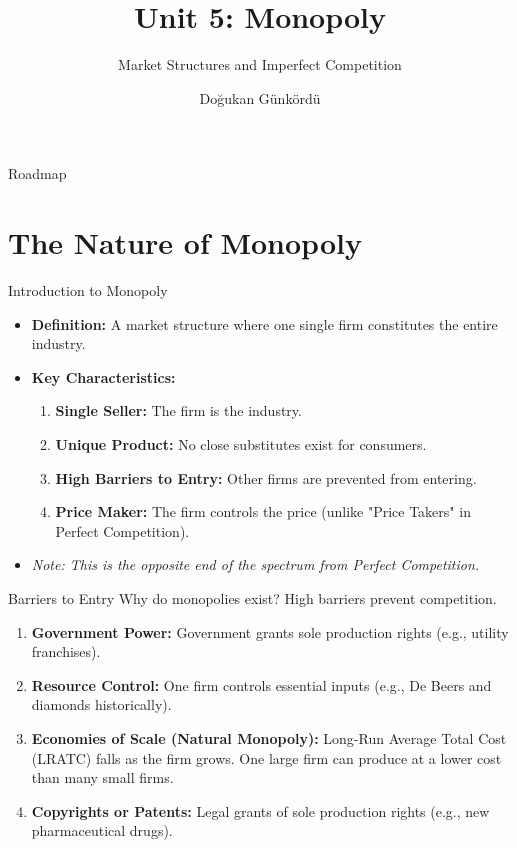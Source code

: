 \documentclass[aspectratio=169, 10pt]{beamer}
\title{Unit 5: Monopoly}
\subtitle{Market Structures and Imperfect Competition}
\author{Doğukan Günkördü}
\date{}
\begin{document}
\begin{frame}
    \titlepage
\end{frame}

\begin{frame}{Roadmap}
    \tableofcontents
\end{frame}

\section{The Nature of Monopoly}

\begin{frame}{Introduction to Monopoly}
    \begin{itemize}
        \item \textbf{Definition:} A market structure where one single firm constitutes the entire industry.
        \item \textbf{Key Characteristics:}
            \begin{enumerate}
                \item \textbf{Single Seller:} The firm is the industry.
                \item \textbf{Unique Product:} No close substitutes exist for consumers.
                \item \textbf{High Barriers to Entry:} Other firms are prevented from entering.
                \item \textbf{Price Maker:} The firm controls the price (unlike "Price Takers" in Perfect Competition).
            \end{enumerate}
        \item \textit{Note: This is the opposite end of the spectrum from Perfect Competition.}
    \end{itemize}
\end{frame}

\begin{frame}{Barriers to Entry}
    Why do monopolies exist? High barriers prevent competition.
    \vspace{0.5cm}
    \begin{enumerate}
        \item \textbf{Government Power:} Government grants sole production rights (e.g., utility franchises).
        \item \textbf{Resource Control:} One firm controls essential inputs (e.g., De Beers and diamonds historically).
        \item \textbf{Economies of Scale (Natural Monopoly):} Long-Run Average Total Cost (LRATC) falls as the firm grows. One large firm can produce at a lower cost than many small firms.
        \item \textbf{Copyrights or Patents:} Legal grants of sole production rights (e.g., new pharmaceutical drugs).
    \end{enumerate}
\end{frame}
\end{document}
